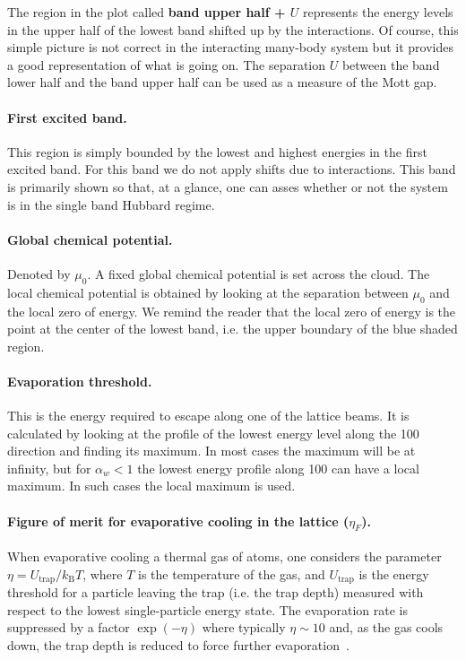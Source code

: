 \documentclass[11pt,letter]{article}
\newcommand{\kb}{\ensuremath{k_{\text{B}}}}
\newcommand{\awaist}{\ensuremath{ \alpha_{w} }}
\begin{document}
The region in the plot called \textbf{band upper half + $U$} represents the
energy levels in the upper half of the lowest band shifted up by the
interactions.  Of course, this simple picture is not correct in the interacting
many-body system but it provides a good representation of what is going on.  The
separation $U$ between the band lower half and the band upper half can be used
as a measure of the Mott gap. 


\paragraph{First excited band.}  This region is simply bounded by the lowest
and highest energies in the first excited band.  For this band we do not apply
shifts due to interactions.   This band is primarily shown so that, at a
glance, one can asses whether or not the system is in the single band Hubbard
regime.  

\paragraph{Global chemical potential.}  Denoted by $\mu_{0}$. A fixed global
chemical potential is set across the cloud.  The local chemical potential is
obtained by looking at the separation between $\mu_{0}$ and the local zero of
energy.   We remind the reader that the local zero of energy is the point at
the center of the lowest band, i.e. the upper boundary of the blue shaded
region.

\paragraph{Evaporation threshold.}  This is the energy required to escape along
one of the lattice beams.  It is calculated by looking at the profile of the
lowest energy level along the 100 direction and finding its maximum.    In most
cases the maximum will be at infinity, but for $\awaist < 1 $ the lowest energy
profile along 100 can have a local maximum.   In such cases the local maximum
is used. 

\paragraph{Figure of merit for evaporative cooling in the lattice
($\eta_{F}$).} 

When evaporative cooling a thermal gas of atoms, one considers the parameter
$\eta=U_{\text{trap}}/\kb T$, where $T$ is the temperature of the gas, and
$U_{\text{trap}}$ is the energy threshold for a particle leaving the trap (i.e.
the trap depth) measured with respect to the lowest single-particle energy
state.  The evaporation rate is suppressed by a factor $\exp(-\eta)$ where
typically $\eta\sim10$ and, as the gas cools down, the trap depth is reduced to
force further evaporation~\cite{OHara2001}.  
\end{document}
